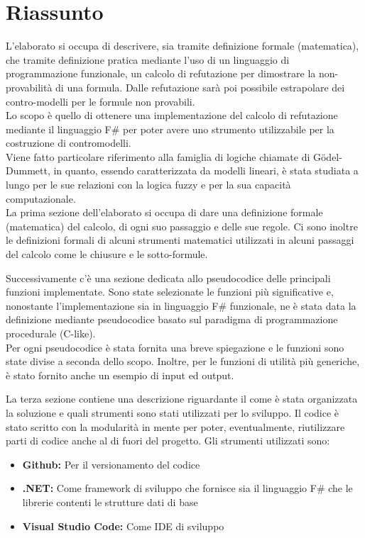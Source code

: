 \documentclass{oist}
\begin{document}
\section*{Riassunto}

L'elaborato si occupa di descrivere, sia tramite definizione formale (matematica), che tramite definizione pratica mediante l'uso di un linguaggio di programmazione funzionale, un calcolo di refutazione per dimostrare la non-provabilità di una formula. Dalle refutazione sarà poi possibile estrapolare dei contro-modelli per le formule non provabili. \\
Lo scopo è quello di ottenere una implementazione del calcolo di refutazione mediante il linguaggio F\# per poter avere uno strumento utilizzabile per la costruzione di contromodelli. \\
Viene fatto particolare riferimento alla famiglia di logiche chiamate di G\"odel-Dummett, in quanto, essendo caratterizzata da modelli lineari, è stata studiata a lungo per le sue relazioni con la logica fuzzy e per la sua capacità computazionale. \\
La prima sezione dell'elaborato si occupa di dare una definizione formale (matematica) del calcolo, di ogni suo passaggio e delle sue regole. Ci sono inoltre le definizioni formali di alcuni strumenti matematici utilizzati in alcuni passaggi del calcolo come le chiusure e le sotto-formule.

Successivamente c'è una sezione dedicata allo pseudocodice delle principali funzioni implementate. Sono state selezionate le funzioni più significative e, nonostante l'implementazione sia in linguaggio F\# funzionale, ne è stata data la definizione mediante pseudocodice basato sul paradigma di programmazione procedurale (C-like). \\
Per ogni pseudocodice è stata fornita una breve spiegazione e le funzioni sono state divise a seconda dello scopo. Inoltre, per le funzioni di utilità più generiche, è stato fornito anche un esempio di input ed output.

La terza sezione contiene una descrizione riguardante il come è stata organizzata la soluzione e quali strumenti sono stati utilizzati per lo sviluppo. Il codice è stato scritto con la modularità in mente per poter, eventualmente, riutilizzare parti di codice anche al di fuori del progetto. Gli strumenti utilizzati sono:
\begin{itemize}
    \item \textbf{Github:} Per il versionamento del codice
    \item \textbf{.NET:} Come framework di sviluppo che fornisce sia il linguaggio F\# che le librerie contenti le strutture dati di base
    \item \textbf{Visual Studio Code:} Come IDE di sviluppo
\end{itemize}
\end{document}
